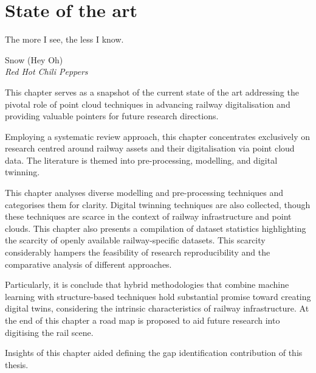 \chapter{State of the art}\label{chap:stoa}
\epigraph{The more I see, the less I know.}{Snow (Hey Oh)\\\textit{Red Hot Chili Peppers}}

This chapter serves as a snapshot of the current state of the art addressing the pivotal role of point cloud techniques in advancing railway digitalisation and providing valuable pointers for future research directions.

Employing a systematic review approach, this chapter concentrates exclusively on research centred around railway assets and their digitalisation via point cloud data. The literature is themed into pre-processing, modelling, and digital twinning. 

This chapter analyses diverse modelling and pre-processing techniques and categorises them for clarity. Digital twinning techniques are also collected, though these techniques are scarce in the context of railway infrastructure and point clouds. This chapter also presents a compilation of dataset statistics highlighting the scarcity of openly available railway-specific datasets. This scarcity considerably hampers the feasibility of research reproducibility and the comparative analysis of different approaches.

Particularly, it is conclude that hybrid methodologies that combine machine learning with structure-based techniques hold substantial promise toward creating digital twins, considering the intrinsic characteristics of railway infrastructure. At the end of this chapter a road map is proposed to aid future research into digitising the rail scene.

Insights of this chapter aided defining the gap identification contribution of this thesis.

\clearpage









\clearpage
\printbibliography[heading=subbibnumbered]